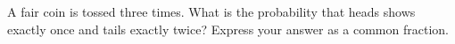 A fair coin is tossed three times. What is the probability that heads shows exactly once and tails exactly twice? Express your answer as a common fraction.
